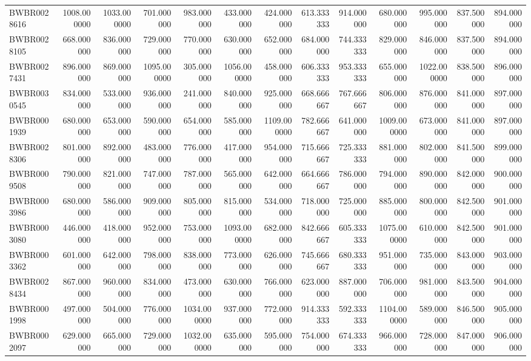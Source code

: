 \begin{longtable}{lrrrrrrrrrrrr}
BWBR0028616 & 1008.000000 & 1033.000000 & 701.000000 & 983.000000 & 433.000000 & 424.000000 & 613.333333 & 914.000000 & 680.000000 & 995.000000 & 837.500000 & 894.000000 \\
BWBR0028105 & 668.000000 & 836.000000 & 729.000000 & 770.000000 & 630.000000 & 652.000000 & 684.000000 & 744.333333 & 829.000000 & 846.000000 & 837.500000 & 894.000000 \\
BWBR0027431 & 896.000000 & 869.000000 & 1095.000000 & 305.000000 & 1056.000000 & 458.000000 & 606.333333 & 953.333333 & 655.000000 & 1022.000000 & 838.500000 & 896.000000 \\
BWBR0030545 & 834.000000 & 533.000000 & 936.000000 & 241.000000 & 840.000000 & 925.000000 & 668.666667 & 767.666667 & 806.000000 & 876.000000 & 841.000000 & 897.000000 \\
BWBR0001939 & 680.000000 & 653.000000 & 590.000000 & 654.000000 & 585.000000 & 1109.000000 & 782.666667 & 641.000000 & 1009.000000 & 673.000000 & 841.000000 & 897.000000 \\
BWBR0028306 & 801.000000 & 892.000000 & 483.000000 & 776.000000 & 417.000000 & 954.000000 & 715.666667 & 725.333333 & 881.000000 & 802.000000 & 841.500000 & 899.000000 \\
BWBR0009508 & 790.000000 & 821.000000 & 747.000000 & 787.000000 & 565.000000 & 642.000000 & 664.666667 & 786.000000 & 794.000000 & 890.000000 & 842.000000 & 900.000000 \\
BWBR0003986 & 680.000000 & 586.000000 & 909.000000 & 805.000000 & 815.000000 & 534.000000 & 718.000000 & 725.000000 & 885.000000 & 800.000000 & 842.500000 & 901.000000 \\
BWBR0003080 & 446.000000 & 418.000000 & 952.000000 & 753.000000 & 1093.000000 & 682.000000 & 842.666667 & 605.333333 & 1075.000000 & 610.000000 & 842.500000 & 901.000000 \\
BWBR0003362 & 601.000000 & 642.000000 & 798.000000 & 838.000000 & 773.000000 & 626.000000 & 745.666667 & 680.333333 & 951.000000 & 735.000000 & 843.000000 & 903.000000 \\
BWBR0028434 & 867.000000 & 960.000000 & 834.000000 & 473.000000 & 630.000000 & 766.000000 & 623.000000 & 887.000000 & 706.000000 & 981.000000 & 843.500000 & 904.000000 \\
BWBR0001998 & 497.000000 & 504.000000 & 776.000000 & 1034.000000 & 937.000000 & 772.000000 & 914.333333 & 592.333333 & 1104.000000 & 589.000000 & 846.500000 & 905.000000 \\
BWBR0002097 & 629.000000 & 665.000000 & 729.000000 & 1032.000000 & 635.000000 & 595.000000 & 754.000000 & 674.333333 & 966.000000 & 728.000000 & 847.000000 & 906.000000 \\

\end{longtable}
